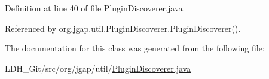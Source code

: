 Definition at line 40 of file Plugin\-Discoverer.\-java.



Referenced by org.\-jgap.\-util.\-Plugin\-Discoverer.\-Plugin\-Discoverer().



The documentation for this class was generated from the following file\-:\begin{DoxyCompactItemize}
\item 
L\-D\-H\-\_\-\-Git/src/org/jgap/util/\hyperlink{_plugin_discoverer_8java}{Plugin\-Discoverer.\-java}\end{DoxyCompactItemize}
